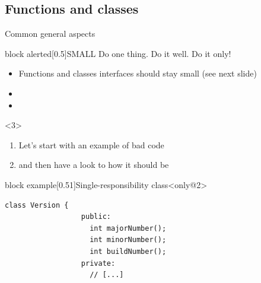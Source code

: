 \subsection{Functions and classes}
\begin{frame}[fragile]{Common general aspects}
    \vspace{-1mm}
    \begin{overlayarea}{\textwidth}{\textheight}
        \begin{varblock}{block alerted}[0.5\textwidth]{SMALL}
            Do \alert{one} thing. Do it \alert{well}. Do it \alert{only}!
        \end{varblock}
        \begin{itemize}[<only@1-3,5>]
            \item Functions and classes interfaces should stay small (see next slide)
            \item {}
            \item {}
        \end{itemize}
        \begin{onlyenv}<3>
            \begin{center}
                \begin{minipage}{0.65\textwidth}
                    \begin{enumerate}
                        \item Let's start with an example of bad code
                        \item and then have a look to how it should be
                    \end{enumerate}
                \end{minipage}
            \end{center}
        \end{onlyenv}
        \vspace{-2mm}
        \begin{varblock}{block example}[0.51\textwidth]{Single-responsibility class}<only@2>
            \begin{lstlisting}[style=MyCpp]
                class Version {
                  public:
                    int majorNumber();
                    int minorNumber();
                    int buildNumber();
                  private:
                    // [...]

\end{lstlisting}
\end{varblock}
\end{overlayarea}
\end{frame}
